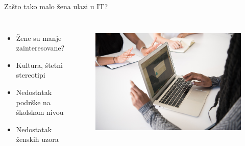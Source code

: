 \documentclass[aspectratio=169]{beamer}
\begin{document}
\begin{frame}{Zašto tako malo žena ulazi u IT?}
  
    \begin{columns}
            \begin{itemize}
            \item<2-> Žene su manje zainteresovane?
            \item<3-> Kultura, štetni stereotipi
            \item<4-> Nedostatak podrške na školskom nivou 
            \item<5-> Nedostatak ženskih uzora
            \end{itemize}

        \begin{figure}[h]
        \centering
        \includegraphics[width = .9\textwidth]{slike/zene_u_ITsektoru.jpg}
        \label{fig:my_label}
        \end{figure}
    \end{columns}
   
\end{frame}

\end{document}
